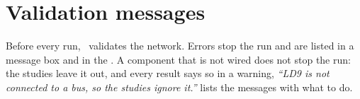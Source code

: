 \section{Validation messages}

Before every run, \app\ validates the network. Errors stop the run and are listed in a
message box and in the . A component that is not wired does not stop the run:
the studies leave it out, and every result says so in a warning, \emph{``LD9 is not
connected to a bus, so the studies ignore it.''}  lists the
messages with what to do.
